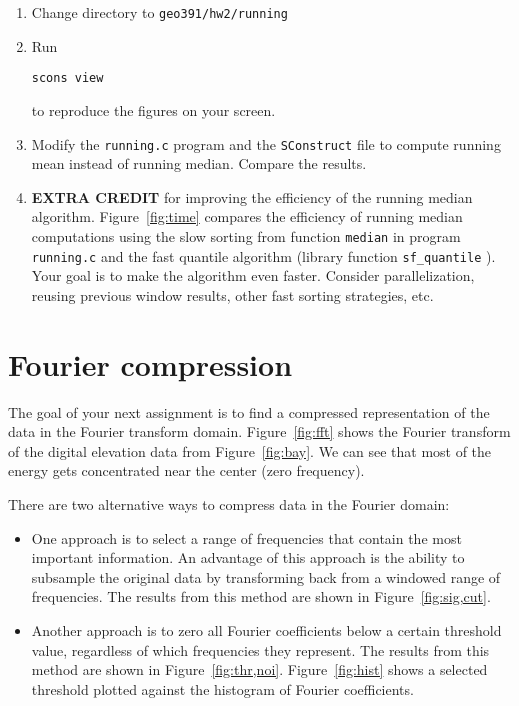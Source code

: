 \begin{enumerate}
\item Change directory to \verb#geo391/hw2/running#
\item Run 
\begin{verbatim}
scons view
\end{verbatim}
to reproduce the figures on your screen.
\item Modify the \texttt{running.c} program and the \texttt{SConstruct} file to compute running mean instead of running median. Compare the results.
\item \textbf{EXTRA CREDIT} for improving the efficiency of the running median algorithm. Figure~\ref{fig:time} compares the efficiency of running median computations using the slow sorting from function \texttt{median} in program \texttt{running.c} and the fast quantile algorithm (library function \verb#sf_quantile# ). Your goal is to make the algorithm even faster. Consider parallelization, reusing previous window results, other fast sorting strategies, etc.
\end{enumerate}

\lstset{language=python,numbers=left,numberstyle=\tiny,showstringspaces=false}


\section{Fourier compression}


The goal of your next assignment is to find a compressed
representation of the data in the Fourier transform
domain. Figure~\ref{fig:fft} shows the Fourier transform of the
digital elevation data from Figure~\ref{fig:bay}. We can see that most
of the energy gets concentrated near the center (zero frequency). 

There are two alternative ways to compress data in the Fourier domain:
\begin{itemize}
\item One approach is to
select a range of frequencies that contain the most important
information. An advantage of this approach is the ability to subsample
the original data by transforming back from a windowed range of frequencies.
The results from this method are shown in Figure~\ref{fig:sig,cut}.
\item Another approach is to zero all Fourier coefficients below a certain threshold value, regardless of which frequencies they represent.  
 The results from this method are shown in Figure~\ref{fig:thr,noi}. Figure~\ref{fig:hist} shows a selected threshold plotted against the histogram of Fourier coefficients.
\end{itemize}


